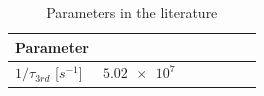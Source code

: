 \hspace*{1em}\begin{table}[h!]
    \centering
    \begin{tabular}{lcccccc}
        \toprule
        {\bf Parameter} & \cite{santorelli2021spectroscopic}  \\
        
        \midrule
        
        $1/\tau_{3rd}$ [$\unit{s^{-1}}$]  & $\SI{5.02e7}{}$  \\
        
        
        \bottomrule
    
    \end{tabular}
    \caption{Parameters in the literature}
    \label{tab:ArCF4litearture}
\end{table}